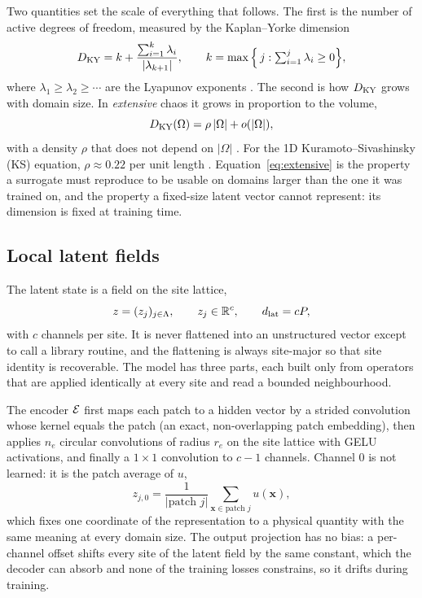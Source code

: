 Two quantities set the scale of everything that follows. The first is
the number of active degrees of freedom, measured by the Kaplan--Yorke
dimension
\begin{equation}
  D_{\mathrm{KY}} = k + \frac{\sum_{i=1}^{k}\lambda_i}{|\lambda_{k+1}|},
  \qquad
  k = \max\Big\{\, j : \textstyle\sum_{i=1}^{j}\lambda_i \ge 0 \Big\},
  \label{eq:dky}
\end{equation}
where $\lambda_1\ge\lambda_2\ge\cdots$ are the Lyapunov exponents
\citep{kaplanyorke1979}. The second is how $D_{\mathrm{KY}}$ grows with domain
size. In \emph{extensive} chaos it grows in proportion to the volume,
\begin{equation}
  D_{\mathrm{KY}}(\Omega) = \rho\,|\Omega| + o(|\Omega|),
  \label{eq:extensive}
\end{equation}
with a density $\rho$ that does not depend on $|\Omega|$
\citep{ruelle1982,manneville1985,egolfgreenside1994}. For the 1D
Kuramoto--Sivashinsky (KS) equation, $\rho\approx0.22$ per unit length
\citep{edson2019}. Equation~\eqref{eq:extensive} is the property a
surrogate must reproduce to be usable on domains larger than the one it
was trained on, and the property a fixed-size latent vector cannot
represent: its dimension is fixed at training time.

\subsection{Local latent fields}
\label{sec:local_field}

The latent state is a field on the site lattice,
\begin{equation}
  z = (z_j)_{j\in\Lambda}, \qquad z_j \in \mathbb{R}^{c},
  \qquad d_{\mathrm{lat}} = cP,
  \label{eq:latent_field}
\end{equation}
with $c$ channels per site. It is never flattened into an unstructured
vector except to call a library routine, and the flattening is always
site-major so that site identity is recoverable. The model has three
parts, each built only from operators that are applied identically at
every site and read a bounded neighbourhood.

The encoder $\mathcal{E}$ first maps each patch to a hidden vector by a strided
convolution whose kernel equals the patch (an exact, non-overlapping
patch embedding), then applies $n_e$ circular convolutions of radius
$r_e$ on the site lattice with GELU activations, and finally a
$1\times1$ convolution to $c-1$ channels. Channel $0$ is not learned: it
is the patch average of $u$,
\begin{equation}
  z_{j,0} = \frac{1}{|\text{patch } j|}\sum_{\bm{x}\in\text{patch } j} u(\bm{x}),
  \label{eq:anchor}
\end{equation}
which fixes one coordinate of the representation to a physical quantity
with the same meaning at every domain size. The output projection has
no bias: a per-channel offset shifts every site of the latent field by
the same constant, which the decoder can absorb and none of the training
losses constrains, so it drifts during training.

